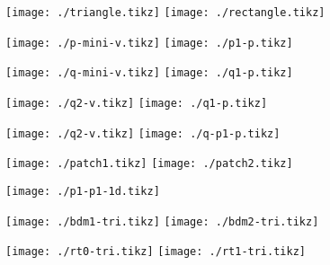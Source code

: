 \documentclass{article}
\begin{document}
\texttt{[image: ./triangle.tikz]}
\texttt{[image: ./rectangle.tikz]}

\texttt{[image: ./p-mini-v.tikz]}
\texttt{[image: ./p1-p.tikz]}

\texttt{[image: ./q-mini-v.tikz]}
\texttt{[image: ./q1-p.tikz]}

\texttt{[image: ./q2-v.tikz]}
\texttt{[image: ./q1-p.tikz]}

\texttt{[image: ./q2-v.tikz]}
\texttt{[image: ./q-p1-p.tikz]}

\texttt{[image: ./patch1.tikz]}
\texttt{[image: ./patch2.tikz]}

\texttt{[image: ./p1-p1-1d.tikz]}

\texttt{[image: ./bdm1-tri.tikz]}
\texttt{[image: ./bdm2-tri.tikz]}

\texttt{[image: ./rt0-tri.tikz]}
\texttt{[image: ./rt1-tri.tikz]}
\end{document}
